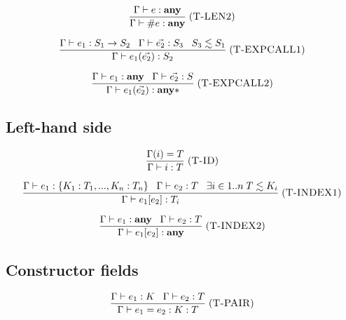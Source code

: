 \documentclass[12pt]{article}
\newcommand{\Any}{\mathbf{any}}
\newcommand{\mylabel}[1]{\; (\textsc{#1})}
\newcommand{\env}{\Gamma}
\begin{document}
\[
\frac{\env \vdash e:\Any}
     {\env \vdash \# e : \Any}
\mylabel{T-LEN2}
\]

\[
\frac{\env \vdash e_{1}:S_{1} \rightarrow S_{2} \;\;\;
      \env \vdash \vec{e_{2}}:S_{3} \;\;\;
      S_{3} \lesssim S_{1}}
     {\env \vdash e_{1}(\vec{e_{2}}) : S_{2}}
\mylabel{T-EXPCALL1}
\]

\[
\frac{\env \vdash e_{1}:\Any \;\;\;
      \env \vdash \vec{e_{2}}:S}
     {\env \vdash e_{1}(\vec{e_{2}}) : \Any{*}}
\mylabel{T-EXPCALL2}
\]

\subsection{Left-hand side}

\[
\frac{\env(i) = T}
     {\env \vdash i : T}
\mylabel{T-ID}
\]

\[
\frac{\env \vdash e_{1} : \{ K_{1}:T_{1}, ..., K_{n}:T_{n} \} \;\;\;
      \env \vdash e_{2} : T \;\;\;
      \exists i \in 1..n \; T \lesssim K_{i}}
     {\env \vdash e_{1}[e_{2}] : T_{i}}
\mylabel{T-INDEX1}
\]

\[
\frac{\env \vdash e_{1}:\Any \;\;\;
      \env \vdash e_{2}:T}
     {\env \vdash e_{1}[e_{2}] : \Any}
\mylabel{T-INDEX2}
\]

\subsection{Constructor fields}

\[
\frac{\env \vdash e_{1} : K \;\;\;
      \env \vdash e_{2} : T}
     {\env \vdash e_{1} = e_{2} : K:T}
\mylabel{T-PAIR}
\]
\end{document}

